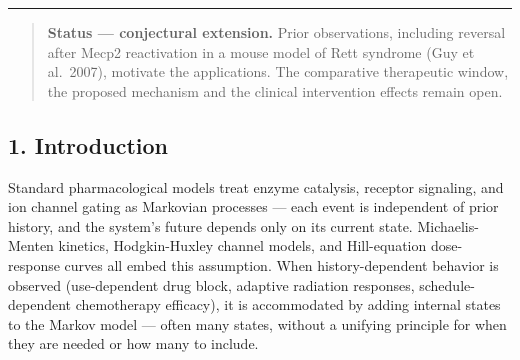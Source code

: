 \documentclass[
]{article}
\begin{document}
\begin{center}\rule{0.5\linewidth}{0.5pt}\end{center}

\begin{quote}
\textbf{Status --- conjectural extension.} Prior observations, including
reversal after Mecp2 reactivation in a mouse model of Rett syndrome (Guy
et al.~2007), motivate the applications. The comparative therapeutic
window, the proposed mechanism and the clinical intervention effects
remain open.
\end{quote}

\hypertarget{introduction}{%
\subsection{1. Introduction}\label{introduction}}

Standard pharmacological models treat enzyme catalysis, receptor
signaling, and ion channel gating as Markovian processes --- each event
is independent of prior history, and the system's future depends only on
its current state. Michaelis-Menten kinetics, Hodgkin-Huxley channel
models, and Hill-equation dose-response curves all embed this
assumption. When history-dependent behavior is observed (use-dependent
drug block, adaptive radiation responses, schedule-dependent
chemotherapy efficacy), it is accommodated by adding internal states to
the Markov model --- often many states, without a unifying principle for
when they are needed or how many to include.
\end{document}
